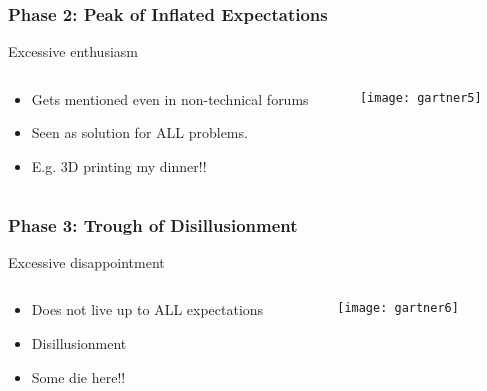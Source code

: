 \begin{frame}[fragile]\frametitle{Phase 2: Peak of Inflated Expectations}

Excessive enthusiasm

 \begin{columns}
  \begin{column}{0.55\linewidth}
\begin{itemize}
\item Gets mentioned even in non-technical forums
\item Seen as solution for ALL problems.
\item E.g. 3D printing my dinner!!
\end{itemize}
  \end{column}%
  \begin{column}{0.45\linewidth}
			\begin{center}
			\texttt{[image: gartner5]}
			\end{center}
  \end{column}
 \end{columns}
 
\end{frame}

\begin{frame}[fragile]\frametitle{Phase 3: Trough of Disillusionment}

Excessive disappointment

 \begin{columns}
  \begin{column}{0.55\linewidth}
\begin{itemize}
\item Does not live up to ALL expectations
\item Disillusionment
\item Some die here!!
\end{itemize}
  \end{column}%
  \begin{column}{0.45\linewidth}
			\begin{center}
			\texttt{[image: gartner6]}
			\end{center}
  \end{column}
 \end{columns}
 
\end{frame}


